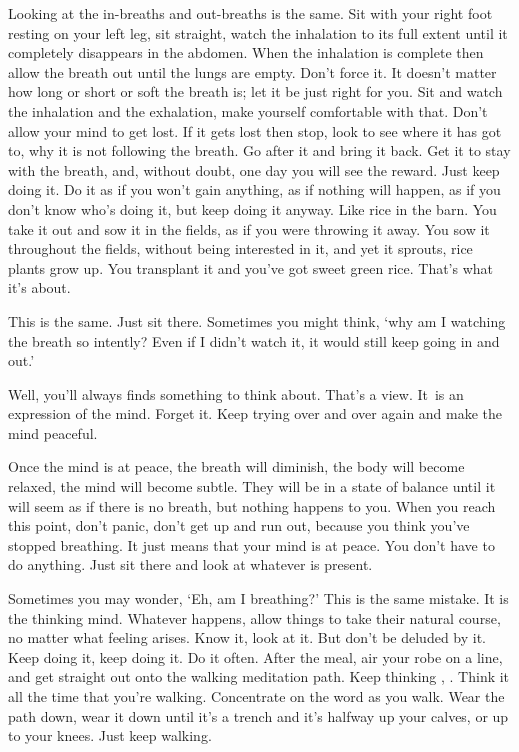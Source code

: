 Looking at the in-breaths and out-breaths is the same. Sit with your right foot resting on your left leg, sit straight, watch the inhalation to its full extent until it completely disappears in the abdomen. When the inhalation is complete then allow the breath out until the lungs are empty. Don't force it. It doesn't matter how long or short or soft the breath is; let it be just right for you. Sit and watch the inhalation and the exhalation, make yourself comfortable with that. Don't allow your mind to get lost. If it gets lost then stop, look to see where it has got to, why it is not following the breath. Go after it and bring it back. Get it to stay with the breath, and, without doubt, one day you will see the reward. Just keep doing it. Do it as if you won't gain anything, as if nothing will happen, as if you don't know who's doing it, but keep doing it anyway. Like rice in the barn. You take it out and sow it in the fields, as if you were throwing it away. You sow it throughout the fields, without being interested in it, and yet it sprouts, rice plants grow up. You transplant it and you've got sweet green rice. That's what it's about.

This is the same. Just sit there. Sometimes you might think, `why am I watching the breath so intently? Even if I didn't watch it, it would still keep going in and out.'

Well, you'll always finds something to think about. That's a view. It~is an expression of the mind. Forget it. Keep trying over and over again and make the mind peaceful.

Once the mind is at peace, the breath will diminish, the body will become relaxed, the mind will become subtle. They will be in a state of balance until it will seem as if there is no breath, but nothing happens to you. When you reach this point, don't panic, don't get up and run out, because you think you've stopped breathing. It just means that your mind is at peace. You don't have to do anything. Just sit there and look at whatever is present.

Sometimes you may wonder, `Eh, am I breathing?' This is the same mistake. It is the thinking mind. Whatever happens, allow things to take their natural course, no matter what feeling arises. Know it, look at it. But don't be deluded by it. Keep doing it, keep doing it. Do it often. After the meal, air your robe on a line, and get straight out onto the walking meditation path. Keep thinking , . Think it all the time that you're walking. Concentrate on the word  as you walk. Wear the path down, wear it down until it's a trench and it's halfway up your calves, or up to your knees. Just keep walking.

